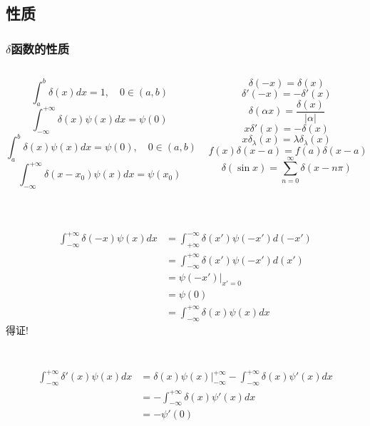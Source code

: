 \subsection{性质}
\begin{frame}
	\frametitle{$\delta$函数的性质}
	\begin{columns}
		\begin{column}[t]{0.46\linewidth}
			\[\int_{a}^{b} \delta(x) d x=1 , \quad 0\in(a,b)\]
			\[\int_{-\infty}^{+\infty} \delta(x) \psi (x) d x=\psi  (0) \]
			\[\int_{a}^{b} \delta(x) \psi (x) d x=\psi (0)  , \quad 0\in(a,b)\]
			\[ \int_{-\infty}^{+\infty} \delta(x-x_0) \psi (x) d x=\psi  (x_0) \]
		\end{column}
		\begin{column}[t]{0.46\linewidth}
	  \[ \delta(-x)=\delta(x)\]
	  \[ \delta'( -x ) = - \delta'( x ) \]
	  \[ \delta(\alpha x ) = \frac{\delta( x ) }{\left|\alpha \right|} \]
	  \[ x\delta'( x ) = - \delta( x ) \]
	  \[ x\delta_{\lambda}( x ) = \lambda \delta_{\lambda}( x ) \]
	  \[ f(x)\delta( x-a ) = f(a)\delta( x-a ) \]
	  \[ \delta( \sin x ) = \sum_{n=0}^{\infty} \delta(x-n\pi)\]
		\end{column}
	\end{columns}
\end{frame}

\begin{frame}
	  \frametitle{}
	  \证 ~  \[
		\begin{aligned}
			\int_{-\infty}^{+\infty} \delta(-x) \psi (x) d x &= \int_{+\infty}^{-\infty} \delta(x') \psi (-x') d (-x') \\
			&= \int_{-\infty}^{+\infty} \delta(x') \psi (-x') d (x') \\
			&=  \psi (-x') | _{x'=0}\\
			&=  \psi (0) \\
			&=  \int_{-\infty}^{+\infty} \delta(x) \psi (x) d x 
		\end{aligned}
		   \]
		得证!
\end{frame}

\begin{frame}
	\frametitle{}
	\证 ~  \[
	  \begin{aligned}
		\int_{-\infty}^{+\infty} \delta'(x) \psi (x) d x &= \delta(x) \psi (x)|_{-\infty}^{+\infty} - \int_{-\infty}^{+\infty} \delta(x) \psi' (x) d x \\
		  &=  - \int_{-\infty}^{+\infty} \delta(x) \psi' (x) d x \\
		  &=  - \psi' (0)
	  \end{aligned}
		 \]
\end{frame}

